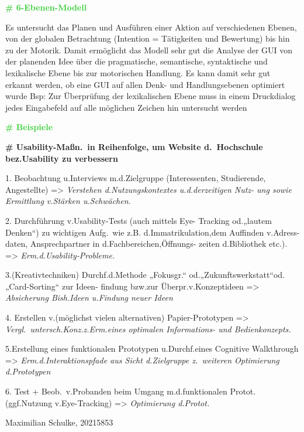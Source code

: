 \documentclass{article}
\begin{document}
\begin{multicols}{3}
\begin{flushleft}
\begin{tiny}
			\textcolor{LimeGreen}{\textbf{\scriptsize{\# 6-Ebenen-Modell}}}

			Es untersucht das Planen und Ausführen einer Aktion auf
			verschiedenen Ebenen, von der globalen Betrachtung (Intention =
			Tätigkeiten und Bewertung) bis hin zu der Motorik. Damit
			ermöglicht das Modell sehr gut die Analyse der GUI von der
			planenden Idee über die pragmatische, semantische, syntaktische
			und lexikalische Ebene bis zur motorischen Handlung. Es kann
			damit sehr gut erkannt werden, ob eine GUI auf allen Denk- und
			Handlungsebenen optimiert wurde Bsp: Zur Überprüfung der
			lexikalischen Ebene muss in einem Druckdialog jedes Eingabefeld
			auf alle möglichen Zeichen hin untersucht werden

			\textcolor{LimeGreen}{\textbf{\scriptsize{\# Beispiele}}}

			\textbf{\# Usability-Maßn.\ in Reihenfolge, um Website d.\
				Hochschule bez.Usability zu verbessern}

			1. Beobachtung u.Interviews m.d.Zielgruppe (Interessenten,
			Studierende, Angestellte) => \textit{Verstehen d.Nutzungskontextes
			u.d.derzeitigen Nutz- ung sowie Ermittlung v.Stärken u.Schwächen.}

			2. Durchführung v.Usability-Tests (auch mittels Eye-
			Tracking od.„lautem Denken“) zu wichtigen Aufg.\
			wie z.B. d.Immatrikulation,dem Auffinden v.Adress-
			daten, Ansprechpartner in d.Fachbereichen,Öffnungs-
			zeiten d.Bibliothek etc.). => \textit{Erm.d.Usability-Probleme.}

			3.(Kreativtechniken) Durchf.d.Methode „Fokusgr.“
			od.„Zukunftswerkstatt“od.„Card-Sorting“ zur Ideen-
			findung bzw.zur Überpr.v.Konzeptideen => \textit{Absicherung
			Bish.Ideen u.Findung neuer Ideen}

			4. Erstellen v.(möglichst vielen alternativen) Papier-Prototypen =>
			\textit{Vergl.\ untersch.Konz.z.Erm.eines optimalen Informations-
			und Bedienkonzepts.}

			5.Erstellung eines funktionalen Prototypen u.Durchf.eines Cognitive
			Walkthrough => \textit{Erm.d.Interaktionspfade aus Sicht
			d.Zielgruppe z.\ weiteren Optimierung d.Prototypen}

			6. Test + Beob.\ v.Probanden beim Umgang m.d.funktionalen Protot.
			(ggf.Nutzung v.Eye-Tracking) => \textit{Optimierung d.Protot.}

			Maximilian Schulke, 20215853
		\end{tiny}
	\end{flushleft}
\end{multicols}
\end{document}
